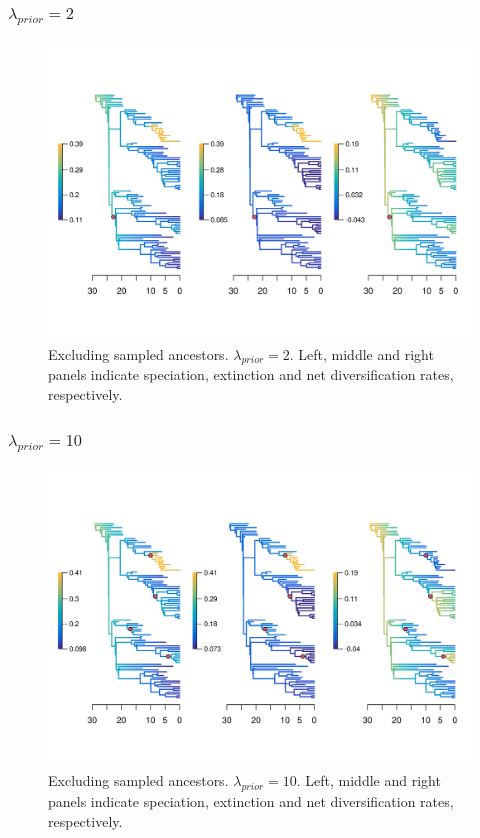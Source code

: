 \documentclass[a4paper, 12pt]{article}
\begin{document}
\subsubsection{$\lambda_{prior} = 2$}

\begin{figure}[H]
  \centering
  \includegraphics[width = \linewidth]{figures/diversification/sensitivity-analyses/shifts-2/sensitivity-analysis-noanc-2.png}
  \caption{Excluding sampled ancestors. $\lambda_{prior} = 2$. Left, middle and right panels indicate speciation, extinction and net diversification rates, respectively.}
  \label{fig-noanc-2}
\end{figure}

\subsubsection{$\lambda_{prior} = 10$}

\begin{figure}[H]
  \centering
  \includegraphics[width = \linewidth]{figures/diversification/sensitivity-analyses/shifts-10/sensitivity-analysis-noanc-10.png}
  \caption{Excluding sampled ancestors. $\lambda_{prior} = 10$. Left, middle and right panels indicate speciation, extinction and net diversification rates, respectively.}
  \label{fig-noanc-10}
\end{figure}
\end{document}
